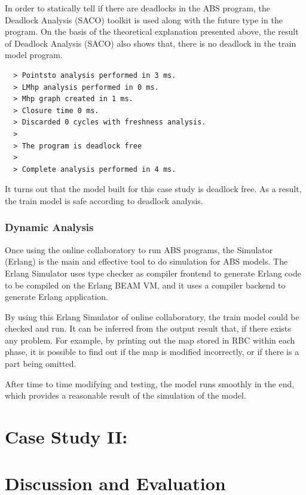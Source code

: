 \documentclass[article,dr=phil,type=msc,colorback,accentcolor=tud9c]{tudthesis}
\begin{document}
  In order to statically tell if there are deadlocks in the ABS program, the Deadlock Analysis (SACO) toolkit is used along with the future type in the program. On the basis of the theoretical explanation presented above, the result of Deadlock Analysis (SACO) also shows that, there is no deadlock in the train model program.
  
  \begin{verbatim}
  > Pointsto analysis performed in 3 ms.
  > LMhp analysis performed in 0 ms.
  > Mhp graph created in 1 ms.
  > Closure time 0 ms.
  > Discarded 0 cycles with freshness analysis.
  >
  > The program is deadlock free
  >
  > Complete analysis performed in 4 ms.
  \end{verbatim}
  
  It turns out that the model built for this case study is deadlock free. As a result, the train model is safe according to deadlock analysis.
  
  
  \subsubsection{Dynamic Analysis}
  
  Once using the online collaboratory to run ABS programs, the Simulator (Erlang) is the main and effective tool to do simulation for ABS models. The Erlang Simulator uses type checker as compiler frontend to generate Erlang code to be compiled on the Erlang BEAM VM, and it uses a compiler backend to generate Erlang application. \cite{abstools}
  
  By using this Erlang Simulator of online collaboratory, the train model could be checked and run. It can be inferred from the output result that, if there exists any problem. For example, by printing out the map stored in RBC within each phase, it is possible to find out if the map is modified incorrectly, or if there is a part being omitted.
  
  After time to time modifying and testing, the model runs smoothly in the end, which provides a reasonable result of the simulation of the model.
  
  
  
  \section{Case Study II: }
  
  \section{Discussion and Evaluation}
  
\end{document}
